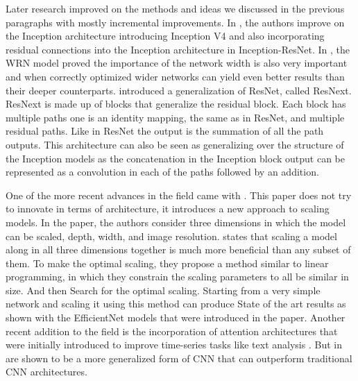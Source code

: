 \documentclass[../main.tex]{subfiles}
\begin{document}
Later research improved on the methods and ideas we discussed in the previous paragraphs with mostly incremental improvements.
In \cite{inceptionv4}, the authors improve on the Inception architecture introducing Inception V4
and also incorporating residual connections into the Inception architecture in Inception-ResNet.
In \cite{wideresnet}, the WRN model proved the importance of the network width is also very important and when correctly optimized
wider networks can yield even better results than their deeper counterparts.
\cite{resnext} introduced a generalization of ResNet, called ResNext.
ResNext is made up of blocks that generalize the residual block. Each block has multiple paths one is an identity mapping,
the same as in ResNet, and multiple residual paths. Like in ResNet the output is the summation of all the path outputs.
This architecture can also be seen as generalizing over the structure of the Inception models as the concatenation in the Inception block output
can be represented as a convolution in each of the paths followed by an addition.
\par

One of the more recent advances in the field came with \cite{effnet}. This paper does not try to innovate in terms of architecture,
it introduces a new approach to scaling models. In the paper, the authors consider three dimensions in which the model can be scaled, depth, width, and image resolution.
\cite{effnet} states that scaling a model along in all three dimensions together is much more beneficial than any subset of them.
To make the optimal scaling, they propose a method similar to linear programming, in which they constrain the scaling parameters to all be similar in size.
And then Search for the optimal scaling.
Starting from a very simple network and scaling it using this method can produce State of the art results
as shown with the EfficientNet models that were introduced in the paper.
Another recent addition to the field is the incorporation of attention architectures that were initially introduced to improve
time-series tasks like text analysis \cite{attention}. But in \cite{image-attention} are shown to be a more generalized
form of CNN that can outperform traditional CNN architectures.
\end{document}
